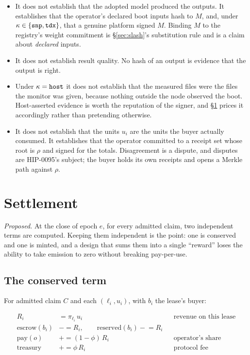 \documentclass[11pt,a4paper]{article}
\newcommand{\code}[1]{\texttt{\hyphenchar\font=`\-\relax #1}}
\newcommand{\esc}{\mathrm{escrow}}
\newcommand{\res}{\mathrm{reserved}}
\newcommand{\pay}{\mathrm{pay}}
\begin{document}
\begin{itemize}
  \item It does not establish that the adopted model produced the outputs. It
    establishes that the operator's declared boot inputs hash to $M$, and, under
    $\kappa \in \{\code{snp},\code{tdx}\}$, that a genuine platform signed $M$.
    Binding $M$ to the registry's weight commitment is §\ref{sec:slash}'s
    substitution rule and is a claim about \emph{declared} inputs.
  \item It does not establish result quality. No hash of an output is evidence
    that the output is right.
  \item Under $\kappa = \code{host}$ it does not establish that the measured
    files were the files the monitor was given, because nothing outside the node
    observed the boot. Host-asserted evidence is worth the reputation of the
    signer, and §\ref{sec:settle} prices it accordingly rather than pretending
    otherwise.
  \item It does not establish that the units $u_i$ are the units the buyer
    actually consumed. It establishes that the operator committed to a receipt
    set whose root is $\rho$ and signed for the totals. Disagreement is a
    dispute, and disputes are HIP-0095's subject; the buyer holds its own
    receipts and opens a Merkle path against $\rho$.
\end{itemize}

\section{Settlement}
\label{sec:settle}

\emph{Proposed.} At the close of epoch $e$, for every admitted claim, two
independent terms are computed. Keeping them independent is the point: one is
conserved and one is minted, and a design that sums them into a single ``reward''
loses the ability to take emission to zero without breaking pay-per-use.

\subsection{The conserved term}

For admitted claim $C$ and each $(\ell_i, u_i)$, with $b_i$ the lease's buyer:

\begin{align*}
  R_i     &= \pi_{\ell_i}\, u_i && \text{revenue on this lease} \\
  \esc(b_i) &\mathrel{-}= R_i,\qquad \res(b_i) \mathrel{-}= R_i \\
  \pay(o) &\mathrel{+}= (1-\phi)\,R_i && \text{operator's share} \\
  \text{treasury} &\mathrel{+}= \phi\, R_i && \text{protocol fee}
\end{align*}
\end{document}

